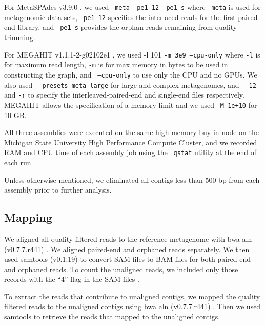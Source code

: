 \documentclass[10pt,a4paper,twocolumn]{article}
\begin{document}
For MetaSPAdes v3.9.0 \cite{spades}, we used { \tt {--meta --pe1-12
    --pe1-s}} where {\tt{--meta}} is used for
metagenomic data sets, {\tt{--pe1-12}} specifies the interlaced reads
for the first paired-end library, and {\tt{--pe1-s}} provides the
orphan reads remaining from quality trimming.

For MEGAHIT v1.1.1-2-g02102e1 \cite{megahit}, we used -l 101 {\tt{-m 3e9
    --cpu-only}} where {\tt -l} is for maximum read length, {\tt -m} is
for max memory in bytes to be used in constructing the graph, and {\tt
  {--cpu-only}} to use only the CPU and no GPUs. We also used {\tt
  {--presets meta-large}} for large and complex metagenomes, and {\tt
  {--12} } and {\tt{-r}} to specify the
interleaved-paired-end and single-end files respectively.  MEGAHIT allows
the specification of a memory limit and we used {\tt -M 1e+10} for 10 GB.

All three assemblies were executed on the same high-memory buy-in node
on the Michigan State University High Performance Compute Cluster, and
we recorded RAM and CPU time of each assembly job using the {\tt
  qstat} utility at the end of each run.

Unless otherwise mentioned, we eliminated all contigs less than 500 bp
from each assembly prior to further analysis.

\subsection*{Mapping}

We aligned all quality-filtered reads to the reference metagenome with
bwa aln (v0.7.7.r441) \cite{bwa}. We aligned paired-end and orphaned
reads separately. We then used samtools (v0.1.19)
\cite{sam-stools} to convert SAM files to BAM files for both
paired-end and orphaned reads. To count the unaligned reads, we
included only those records with the ``4'' flag in the SAM files
\cite{sam-stools}.
 

To extract the reads that contribute to unaligned contigs, we mapped
the quality filtered reads to the unaligned contigs using bwa aln
(v0.7.7.r441) \cite{bwa}.  Then we used samtools to retrieve the reads
that mapped to the unaligned contigs.



\end{document}
